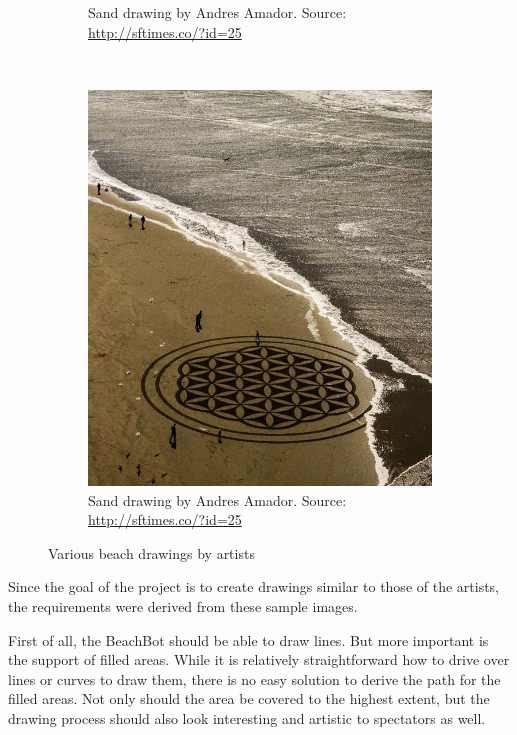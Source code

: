 \begin{figure}
\begin{subfigure}[b]{0.46\textwidth}
\caption{Sand drawing by Andres Amador. Source: \url{http://sftimes.co/?id=25}}
\end{subfigure}
~
\begin{subfigure}[b]{0.46\textwidth}
\includegraphics[width=\textwidth]{images/requirements_inspiration/andres_armador_2.jpg} 
\caption{Sand drawing by Andres Amador. Source: \url{http://sftimes.co/?id=25}}
\end{subfigure}
\caption{Various beach drawings by artists}
\label{fig:sandart_inspiration}
\end{figure}

Since the goal of the project is to create drawings similar to those of the artists, the requirements were derived from these sample images.

First of all, the BeachBot should be able to draw lines. But more important is the support of filled areas. While it is relatively straightforward how to drive over lines or curves to draw them, there is no easy solution to derive the path for the filled areas. Not only should the area be covered to the highest extent, but the drawing process should also look interesting and artistic to spectators as well.

